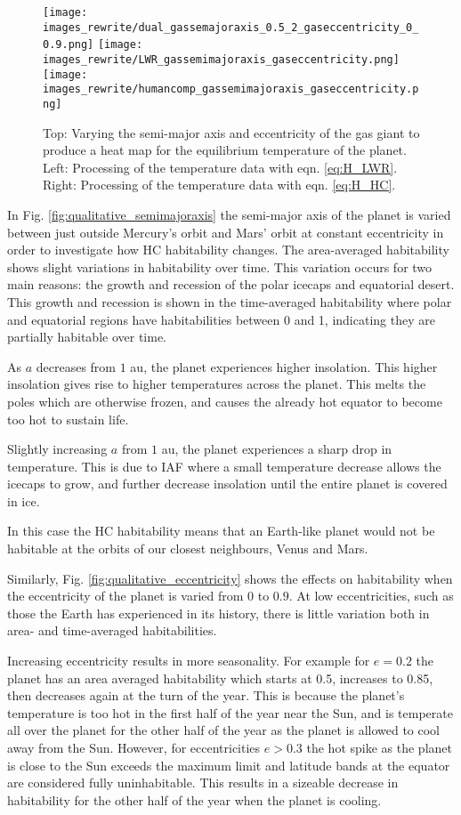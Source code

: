 \documentclass[12pt, onecolumn]{revtex4-2}    %
\begin{document}
\begin{figure}[t]
  \texttt{[image: images\_rewrite/dual\_gassemajoraxis\_0.5\_2\_gaseccentricity\_0\_0.9.png]}
  \texttt{[image: images\_rewrite/LWR\_gassemimajoraxis\_gaseccentricity.png]}
  \texttt{[image: images\_rewrite/humancomp\_gassemimajoraxis\_gaseccentricity.png]}
  \caption{
    Top: Varying the semi-major axis and eccentricity of the gas giant to produce a heat map for the equilibrium temperature of the planet.
    Left: Processing of the temperature data with eqn. \eqref{eq:H_LWR}.
    Right: Processing of the temperature data with eqn. \eqref{eq:H_HC}.
  }
  \label{fig:qualitative_semimajoraxis_eccentricity}
\end{figure}

In Fig. \ref{fig:qualitative_semimajoraxis} the semi-major axis of the planet is varied between just outside Mercury's orbit and Mars' orbit at constant eccentricity in order to investigate how HC habitability changes.
The area-averaged habitability shows slight variations in habitability over time.
This variation occurs for two main reasons: the growth and recession of the polar icecaps and equatorial desert.
This growth and recession is shown in the time-averaged habitability where polar and equatorial regions have habitabilities between 0 and 1, indicating they are partially habitable over time.

As $a$ decreases from $1$ au, the planet experiences higher insolation.
This higher insolation gives rise to higher temperatures across the planet.
This melts the poles which are otherwise frozen, and causes the already hot equator to become too hot to sustain life.

Slightly increasing $a$ from $1$ au, the planet experiences a sharp drop in temperature.
This is due to IAF where a small temperature decrease allows the icecaps to grow, and further decrease insolation until the entire planet is covered in ice.

In this case the HC habitability means that an Earth-like planet would not be habitable at the orbits of our closest neighbours, Venus and Mars.


Similarly, Fig. \ref{fig:qualitative_eccentricity} shows the effects on habitability when the eccentricity of the planet is varied from $0$ to $0.9$.
At low eccentricities, such as those the Earth has experienced in its history, there is little variation both in area- and time-averaged habitabilities.

Increasing eccentricity results in more seasonality.
For example for $e=0.2$ the planet has an area averaged habitability which starts at 0.5, increases to 0.85, then decreases again at the turn of the year.
This is because the planet's temperature is too hot in the first half of the year near the Sun, and is temperate all over the planet for the other half of the year as the planet is allowed to cool away from the Sun.
However, for eccentricities $e>0.3$ the hot spike as the planet is close to the Sun exceeds the maximum limit and latitude bands at the equator are considered fully uninhabitable.
This results in a sizeable decrease in habitability for the other half of the year when the planet is cooling.
\end{document}
